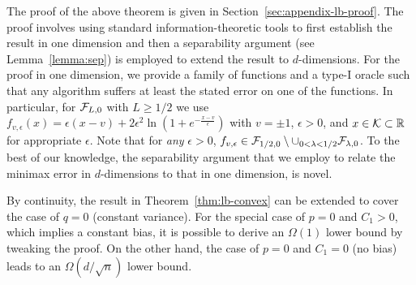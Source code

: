 The proof of the above theorem is given in Section~\ref{sec:appendix-lb-proof}. The proof involves using standard information-theoretic tools to first establish the result in one dimension and then a separability argument (see Lemma~\ref{lemma:sep}) is employed to extend the result to $d$-dimensions. 
For the proof in one dimension, we provide a family of functions and a type-I oracle such that any algorithm suffers at least the stated error on one of the functions. In particular, for $\mathcal{F}_{L,0}$ with $L\ge 1/2$ we use
$f_{v,\epsilon}(x)=\epsilon\left( x-v\right)+2\epsilon^2 \ln\left(1+e^{-\frac{x-v}{\epsilon}}  \right)$ with $v=\pm 1$, $\epsilon>0$, and $x \in \mathcal{K} \subset \mathbb{R}$ for appropriate $\epsilon$. Note that for \emph{any} $\epsilon>0$, $f_{v,\epsilon}\in \mathcal{F}_{1/2,0}\setminus \cup_{0<\lambda<1/2} \mathcal{F}_{\lambda,0}$.
To the best of our knowledge, the separability argument that we employ to relate the minimax error in $d$-dimensions to that in one dimension, is novel. 

\begin{remark}
By continuity, the result in Theorem~\ref{thm:lb-convex} can be extended to cover the case of $q=0$ (constant variance). 
For the special case of $p=0$ and $C_1>0$, which implies a constant bias, it is possible to derive an $\Omega(1)$ lower bound by tweaking the proof. On the other hand, the case of $p=0$ and $C_1=0$ (no bias) leads to an $\Omega(d/\sqrt{n})$ lower bound. 
\end{remark}

